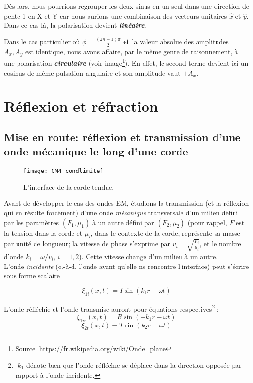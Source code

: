 Dès lors, nous pourrions regrouper les deux sinus en un seul dans une direction de pente 1 en X et Y car nous aurions une combinaison 
des vecteurs unitaires $\hat{x}$ et $\hat{y}$. Dans ce cas-là, la polarisation devient \textit{\textbf{linéaire}}.

Dans le cas particulier où $\phi = \frac{(2n+1) \pi }{2}$ \textbf{et} la valeur absolue des amplitudes $A_{x}, A_{y}$ est identique, 
nous avons affaire, par le même genre de raisonnement, à une polarisation \textit{\textbf{circulaire}} (voir image\footnote{Source: \url{https://fr.wikipedia.org/wiki/Onde_plane}}). 
En effet, le second terme devient ici un cosinus de même pulsation angulaire et son amplitude vaut $\pm A_{x}$. 


\section{Réflexion et réfraction} 

\subsection{Mise en route: réflexion et transmission d'une onde mécanique le long d'une corde} 

\begin{figure*}
	\texttt{[image: CM4\_condlimite]}
	\caption{L'interface de la corde tendue.}
\end{figure*}
Avant de développer le cas des ondes EM, étudions la transmission (et la réflexion qui en résulte forcément) d'une onde \textit{mécanique} transversale d'un milieu défini par les paramètres $({F}_1,{\mu_1})$ à un autre défini par $({F}_2,{\mu_2})$ (pour rappel, $F$ est la tension dans la corde et $\mu_i$, dans le contexte de la corde, représente sa masse par unité de longueur; la vitesse de phase s'exprime par $v_i = \sqrt{\frac{F_i}{\mu_i}}$, et le nombre d'onde $k_i = \omega/v_i$, $i = 1, 2$). Cette vitesse change d'un milieu à un autre.\\
L'onde \textit{incidente} (c.-à-d. l'onde avant qu'elle ne rencontre l'interface) peut s'écrire sous forme scalaire

\[ \xi_{1i}(x,t) = I \sin(k_{1}r - \omega t) \]

L'onde réfléchie et l'onde transmise auront pour équations respectives\footnote{-$k_{1}$ dénote bien que l'onde réfléchie se déplace dans la direction opposée par rapport à l'onde incidente.} : 
\[ \xi_{1ir}(x,t) = R \sin(-k_{1}r - \omega t) \]
\[ \xi_{2t}(x,t) = T \sin(k_{2}r - \omega t) \]

